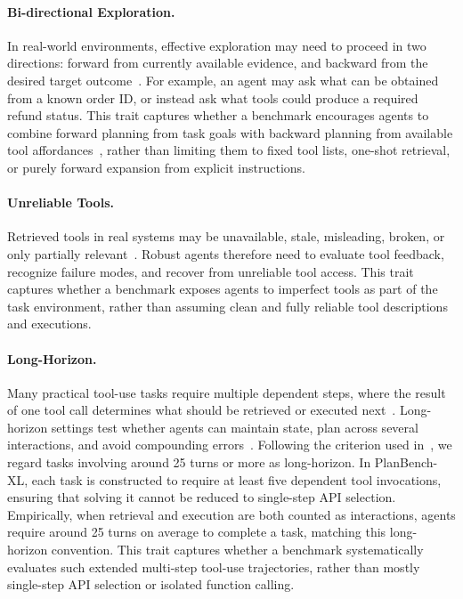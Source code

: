 \documentclass{llmxive}
\providecommand{\bench}[1]{PlanBench-XL}
\begin{document}
\paragraph{Bi-directional Exploration.}
In real-world environments, effective exploration may need to proceed in two directions: forward from currently available evidence, and backward from the desired target outcome~\citep{BackwardPlanningLLM}. 
For example, an agent may ask what can be obtained from a known order ID, or instead ask what tools could produce a required refund status. 
This trait captures whether a benchmark encourages agents to combine forward planning from task goals with backward planning from available tool affordances~\citep{CreativityBench}, rather than limiting them to fixed tool lists, one-shot retrieval, or purely forward expansion from explicit instructions.

\paragraph{Unreliable Tools.}
Retrieved tools in real systems may be unavailable, stale, misleading, broken, or only partially relevant~\citep{CostBench, UserBench}. 
Robust agents therefore need to evaluate tool feedback, recognize failure modes, and recover from unreliable tool access. 
This trait captures whether a benchmark exposes agents to imperfect tools as part of the task environment, rather than assuming clean and fully reliable tool descriptions and executions.

\paragraph{Long-Horizon.}
Many practical tool-use tasks require multiple dependent steps, where the result of one tool call determines what should be retrieved or executed next~\citep{ReAct}.
Long-horizon settings test whether agents can maintain state, plan across several interactions, and avoid compounding errors~\citep{AgentBench, WebArena, NESTful}.
Following the criterion used in~\citet{Tool-Decathlon}, we regard tasks involving around 25 turns or more as long-horizon.
In \bench{}, each task is constructed to require at least five dependent tool invocations, ensuring that solving it cannot be reduced to single-step API selection.
Empirically, when retrieval and execution are both counted as interactions, agents require around 25 turns on average to complete a task, matching this long-horizon convention.
This trait captures whether a benchmark systematically evaluates such extended multi-step tool-use trajectories, rather than mostly single-step API selection or isolated function calling.
\end{document}
